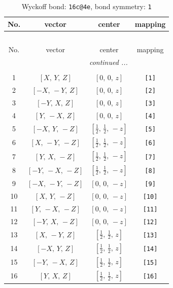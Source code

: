 \documentclass[fleqn,8pt]{jsarticle}
\begin{document}
\begin{longtable}{cccc}
\caption{Wyckoff bond: {\tt 16c@4e}, bond symmetry: {\tt 1}}
 \\
 \hline \hline
No. & vector & center & mapping \\ \hline \endfirsthead

\multicolumn{3}{l}{\tablename\ \thetable{}} \\
 \hline \hline
No. & vector & center & mapping \\ \hline \endhead

 \hline \hline
\multicolumn{3}{r}{\footnotesize\it continued ...} \\ \endfoot

 \hline \hline
\multicolumn{3}{r}{} \\ \endlastfoot

1 & $\left[ X,\, Y,\, Z \right]$ & $\left[ 0,\, 0,\, z \right]$ & {\tt [1]} \\ \hline
2 & $\left[ - X,\, - Y,\, Z \right]$ & $\left[ 0,\, 0,\, z \right]$ & {\tt [2]} \\ \hline
3 & $\left[ - Y,\, X,\, Z \right]$ & $\left[ 0,\, 0,\, z \right]$ & {\tt [3]} \\ \hline
4 & $\left[ Y,\, - X,\, Z \right]$ & $\left[ 0,\, 0,\, z \right]$ & {\tt [4]} \\ \hline
5 & $\left[ - X,\, Y,\, - Z \right]$ & $\left[ \frac{1}{2},\, \frac{1}{2},\, - z \right]$ & {\tt [5]} \\ \hline
6 & $\left[ X,\, - Y,\, - Z \right]$ & $\left[ \frac{1}{2},\, \frac{1}{2},\, - z \right]$ & {\tt [6]} \\ \hline
7 & $\left[ Y,\, X,\, - Z \right]$ & $\left[ \frac{1}{2},\, \frac{1}{2},\, - z \right]$ & {\tt [7]} \\ \hline
8 & $\left[ - Y,\, - X,\, - Z \right]$ & $\left[ \frac{1}{2},\, \frac{1}{2},\, - z \right]$ & {\tt [8]} \\ \hline
9 & $\left[ - X,\, - Y,\, - Z \right]$ & $\left[ 0,\, 0,\, - z \right]$ & {\tt [9]} \\ \hline
10 & $\left[ X,\, Y,\, - Z \right]$ & $\left[ 0,\, 0,\, - z \right]$ & {\tt [10]} \\ \hline
11 & $\left[ Y,\, - X,\, - Z \right]$ & $\left[ 0,\, 0,\, - z \right]$ & {\tt [11]} \\ \hline
12 & $\left[ - Y,\, X,\, - Z \right]$ & $\left[ 0,\, 0,\, - z \right]$ & {\tt [12]} \\ \hline
13 & $\left[ X,\, - Y,\, Z \right]$ & $\left[ \frac{1}{2},\, \frac{1}{2},\, z \right]$ & {\tt [13]} \\ \hline
14 & $\left[ - X,\, Y,\, Z \right]$ & $\left[ \frac{1}{2},\, \frac{1}{2},\, z \right]$ & {\tt [14]} \\ \hline
15 & $\left[ - Y,\, - X,\, Z \right]$ & $\left[ \frac{1}{2},\, \frac{1}{2},\, z \right]$ & {\tt [15]} \\ \hline
16 & $\left[ Y,\, X,\, Z \right]$ & $\left[ \frac{1}{2},\, \frac{1}{2},\, z \right]$ & {\tt [16]} \\
\end{longtable}
\end{document}
